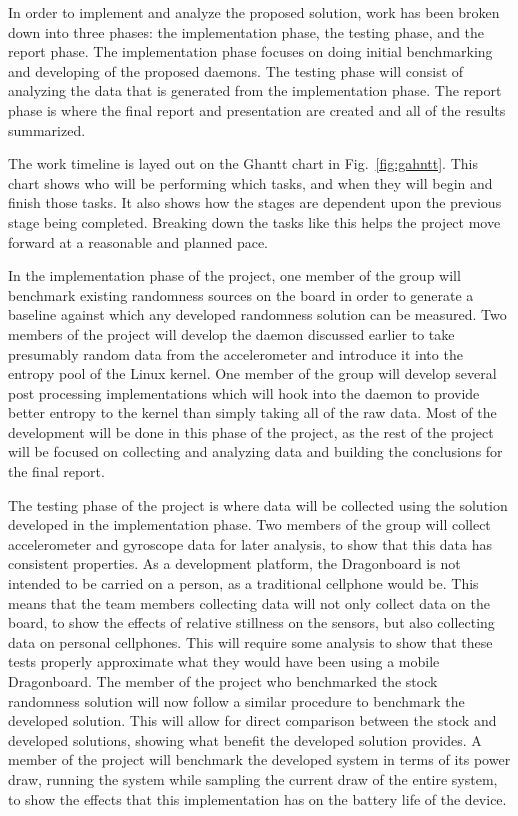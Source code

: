 
In order to implement and analyze the proposed solution, work has been broken
down into three phases: the implementation phase, the testing phase, and the
report phase. The implementation phase focuses on doing initial benchmarking and
developing of the proposed daemons. The testing phase will consist of analyzing
the data that is generated from the implementation phase. The report phase is
where the final report and presentation are created and all of the results
summarized. 

The work timeline is layed out on the Ghantt chart in Fig.~\ref{fig:gahntt}.
This chart shows who will be performing which tasks, and when they will begin
and finish those tasks. It also shows how the stages are dependent upon the
previous stage being completed. Breaking down the tasks like this helps the
project move forward at a reasonable and planned pace.

In the implementation phase of the project, one member of the group will
benchmark existing randomness sources on the board in order to generate a
baseline against which any developed randomness solution can be measured. Two
members of the project will develop the daemon discussed earlier to take
presumably random data from the accelerometer and introduce it into the entropy
pool of the Linux kernel. One member of the group will develop several post
processing implementations which will hook into the daemon to provide better
entropy to the kernel than simply taking all of the raw data. Most of the
development will be done in this phase of the project, as the rest of the
project will be focused on collecting and analyzing data and building the
conclusions for the final report.

The testing phase of the project is where data will be collected using the
solution developed in the implementation phase. Two members of the group will
collect accelerometer and gyroscope data for later analysis, to show that this
data has consistent properties. As a development platform, the Dragonboard is
not intended to be carried on a person, as a traditional cellphone would be.
This means that the team members collecting data will not only collect data on
the board, to show the effects of relative stillness on the sensors, but also
collecting data on personal cellphones. This will require some analysis to show
that these tests properly approximate what they would have been using a mobile
Dragonboard. The member of the project who benchmarked the stock randomness
solution will now follow a similar procedure to benchmark the developed
solution. This will allow for direct comparison between the stock and developed
solutions, showing what benefit the developed solution provides. A member of the
project will benchmark the developed system in terms of its power draw, running
the system while sampling the current draw of the entire system, to show the
effects that this implementation has on the battery life of the device.


